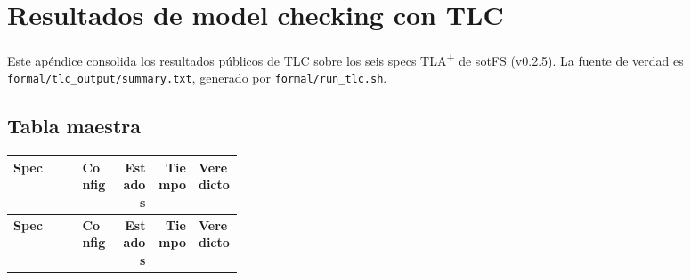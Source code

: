 \chapter{Resultados de model checking con TLC}
\label{ap:tlc-results}

Este apéndice consolida los resultados públicos de TLC sobre los seis
specs TLA\textsuperscript{+} de sotFS (v0.2.5). La fuente de verdad es
\texttt{formal/tlc\_output/summary.txt}, generado por
\texttt{formal/run\_tlc.sh}.

\section*{Tabla maestra}

\begin{longtable}{p{0.30\linewidth} l r r l}
  \toprule
  \textbf{Spec} & \textbf{Config} & \textbf{Estados} & \textbf{Tiempo} & \textbf{Veredicto} \\
  \midrule
  \endfirsthead

  \toprule
  \textbf{Spec} & \textbf{Config} & \textbf{Estados} & \textbf{Tiempo} & \textbf{Veredicto} \\
  \midrule
  \endhead


\end{longtable}
